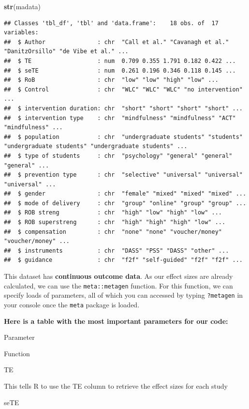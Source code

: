 \documentclass[]{book}
\newenvironment{Shaded}{\begin{snugshade}}{\end{snugshade}}
\newcommand{\KeywordTok}[1]{\textcolor[rgb]{0.13,0.29,0.53}{\textbf{#1}}}
\newcommand{\NormalTok}[1]{#1}
\begin{document}
\begin{Shaded}
\begin{Highlighting}[]
\KeywordTok{str}\NormalTok{(madata)}
\end{Highlighting}
\end{Shaded}

\begin{verbatim}
## Classes 'tbl_df', 'tbl' and 'data.frame':    18 obs. of  17 variables:
##  $ Author               : chr  "Call et al." "Cavanagh et al." "DanitzOrsillo" "de Vibe et al." ...
##  $ TE                   : num  0.709 0.355 1.791 0.182 0.422 ...
##  $ seTE                 : num  0.261 0.196 0.346 0.118 0.145 ...
##  $ RoB                  : chr  "low" "low" "high" "low" ...
##  $ Control              : chr  "WLC" "WLC" "WLC" "no intervention" ...
##  $ intervention duration: chr  "short" "short" "short" "short" ...
##  $ intervention type    : chr  "mindfulness" "mindfulness" "ACT" "mindfulness" ...
##  $ population           : chr  "undergraduate students" "students" "undergraduate students" "undergraduate students" ...
##  $ type of students     : chr  "psychology" "general" "general" "general" ...
##  $ prevention type      : chr  "selective" "universal" "universal" "universal" ...
##  $ gender               : chr  "female" "mixed" "mixed" "mixed" ...
##  $ mode of delivery     : chr  "group" "online" "group" "group" ...
##  $ ROB streng           : chr  "high" "low" "high" "low" ...
##  $ ROB superstreng      : chr  "high" "high" "high" "low" ...
##  $ compensation         : chr  "none" "none" "voucher/money" "voucher/money" ...
##  $ instruments          : chr  "DASS" "PSS" "DASS" "other" ...
##  $ guidance             : chr  "f2f" "self-guided" "f2f" "f2f" ...
\end{verbatim}

This dataset has \textbf{continuous outcome data}. As our effect sizes are already calculated, we can use the \texttt{meta::metagen} function. For this function, we can specify loads of parameters, all of which you can accessed by typing \texttt{?metagen} in your console once the \texttt{meta} package is loaded.

\textbf{Here is a table with the most important parameters for our code:}

Parameter

Function

TE

This tells R to use the TE column to retrieve the effect sizes for each study

seTE
\end{document}
